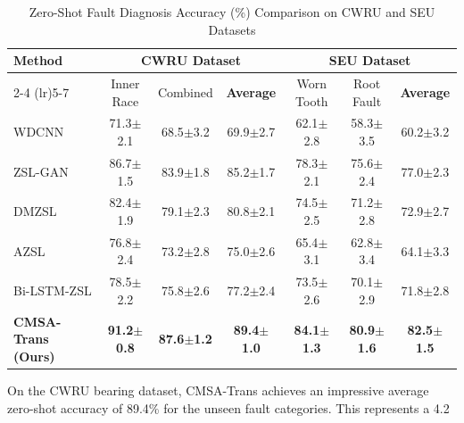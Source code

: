 \documentclass[journal]{IEEEtran}
\begin{document}
\begin{table}[!t]
\centering
\caption{Zero-Shot Fault Diagnosis Accuracy (\%) Comparison on CWRU and SEU Datasets}
\label{tab:comparison}
\renewcommand{\arraystretch}{1.2}
\begin{tabular}{lcccccc}
\toprule
\multirow{2}{*}{\textbf{Method}} & \multicolumn{3}{c}{\textbf{CWRU Dataset}} & \multicolumn{3}{c}{\textbf{SEU Dataset}} \\
\cmidrule(lr){2-4} \cmidrule(lr){5-7}
 & Inner Race & Combined & \textbf{Average} & Worn Tooth & Root Fault & \textbf{Average} \\
\midrule
WDCNN \cite{zhang2017new} & 71.3$\pm$2.1 & 68.5$\pm$3.2 & 69.9$\pm$2.7 & 62.1$\pm$2.8 & 58.3$\pm$3.5 & 60.2$\pm$3.2 \\
ZSL-GAN \cite{xian2019fvaegan} & 86.7$\pm$1.5 & 83.9$\pm$1.8 & 85.2$\pm$1.7 & 78.3$\pm$2.1 & 75.6$\pm$2.4 & 77.0$\pm$2.3 \\
DMZSL \cite{schonfeld2019generalized} & 82.4$\pm$1.9 & 79.1$\pm$2.3 & 80.8$\pm$2.1 & 74.5$\pm$2.5 & 71.2$\pm$2.8 & 72.9$\pm$2.7 \\
AZSL \cite{lampert2014attribute} & 76.8$\pm$2.4 & 73.2$\pm$2.8 & 75.0$\pm$2.6 & 65.4$\pm$3.1 & 62.8$\pm$3.4 & 64.1$\pm$3.3 \\
Bi-LSTM-ZSL \cite{chen2019bearing} & 78.5$\pm$2.2 & 75.8$\pm$2.6 & 77.2$\pm$2.4 & 73.5$\pm$2.6 & 70.1$\pm$2.9 & 71.8$\pm$2.8 \\
\midrule
\textbf{CMSA-Trans (Ours)} & \textbf{91.2$\pm$0.8} & \textbf{87.6$\pm$1.2} & \textbf{89.4$\pm$1.0} & \textbf{84.1$\pm$1.3} & \textbf{80.9$\pm$1.6} & \textbf{82.5$\pm$1.5} \\
\bottomrule
\end{tabular}
\end{table}

On the CWRU bearing dataset, CMSA-Trans achieves an impressive average zero-shot accuracy of 89.4\% for the unseen fault categories. This represents a 4.2%
\end{document}

